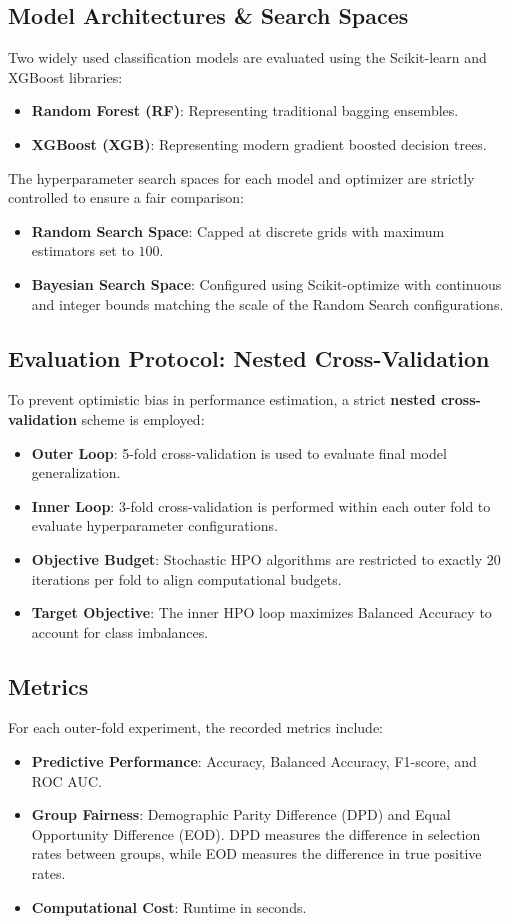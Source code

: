 \documentclass[11pt,a4paper]{article}
\begin{document}
\subsection{Model Architectures \& Search Spaces}
Two widely used classification models are evaluated using the Scikit-learn \citep{scikit-learn} and XGBoost \citep{xgboost} libraries:
\begin{itemize}
    \item \textbf{Random Forest (RF)}: Representing traditional bagging ensembles.
    \item \textbf{XGBoost (XGB)}: Representing modern gradient boosted decision trees.
\end{itemize}
The hyperparameter search spaces for each model and optimizer are strictly controlled to ensure a fair comparison:
\begin{itemize}
    \item \textbf{Random Search Space}: Capped at discrete grids with maximum estimators set to $100$.
    \item \textbf{Bayesian Search Space}: Configured using Scikit-optimize \citep{scikit-optimize} with continuous and integer bounds matching the scale of the Random Search configurations.
\end{itemize}

\subsection{Evaluation Protocol: Nested Cross-Validation}
To prevent optimistic bias in performance estimation, a strict \textbf{nested cross-validation} scheme is employed:
\begin{itemize}
    \item \textbf{Outer Loop}: 5-fold cross-validation is used to evaluate final model generalization.
    \item \textbf{Inner Loop}: 3-fold cross-validation is performed within each outer fold to evaluate hyperparameter configurations.
    \item \textbf{Objective Budget}: Stochastic HPO algorithms are restricted to exactly $20$ iterations per fold to align computational budgets.
    \item \textbf{Target Objective}: The inner HPO loop maximizes Balanced Accuracy to account for class imbalances.
\end{itemize}

\subsection{Metrics}
For each outer-fold experiment, the recorded metrics include:
\begin{itemize}
    \item \textbf{Predictive Performance}: Accuracy, Balanced Accuracy, F1-score, and ROC AUC.
    \item \textbf{Group Fairness}: Demographic Parity Difference (DPD) and Equal Opportunity Difference (EOD). DPD measures the difference in selection rates between groups, while EOD measures the difference in true positive rates.
    \item \textbf{Computational Cost}: Runtime in seconds.
\end{itemize}
\end{document}
